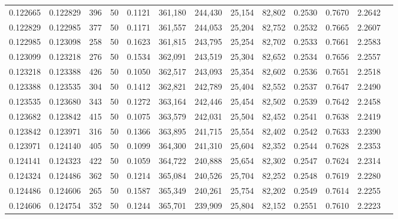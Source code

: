 \begin{tabular}{rrrrrrrrrrrrr}
0.122665 & 0.122829 &   396 &  50 &                                     0.1121 & 361,180 & 244,430 &  25,154 &  82,802 & 0.2530 & 0.7670 & 2.2642 \\
0.122829 & 0.122985 &   377 &  50 &                                     0.1171 & 361,557 & 244,053 &  25,204 &  82,752 & 0.2532 & 0.7665 & 2.2607 \\
0.122985 & 0.123098 &   258 &  50 &                                     0.1623 & 361,815 & 243,795 &  25,254 &  82,702 & 0.2533 & 0.7661 & 2.2583 \\
0.123099 & 0.123218 &   276 &  50 &                                     0.1534 & 362,091 & 243,519 &  25,304 &  82,652 & 0.2534 & 0.7656 & 2.2557 \\
0.123218 & 0.123388 &   426 &  50 &                                     0.1050 & 362,517 & 243,093 &  25,354 &  82,602 & 0.2536 & 0.7651 & 2.2518 \\
0.123388 & 0.123535 &   304 &  50 &                                     0.1412 & 362,821 & 242,789 &  25,404 &  82,552 & 0.2537 & 0.7647 & 2.2490 \\
0.123535 & 0.123680 &   343 &  50 &                                     0.1272 & 363,164 & 242,446 &  25,454 &  82,502 & 0.2539 & 0.7642 & 2.2458 \\
0.123682 & 0.123842 &   415 &  50 &                                     0.1075 & 363,579 & 242,031 &  25,504 &  82,452 & 0.2541 & 0.7638 & 2.2419 \\
0.123842 & 0.123971 &   316 &  50 &                                     0.1366 & 363,895 & 241,715 &  25,554 &  82,402 & 0.2542 & 0.7633 & 2.2390 \\
0.123971 & 0.124140 &   405 &  50 &                                     0.1099 & 364,300 & 241,310 &  25,604 &  82,352 & 0.2544 & 0.7628 & 2.2353 \\
0.124141 & 0.124323 &   422 &  50 &                                     0.1059 & 364,722 & 240,888 &  25,654 &  82,302 & 0.2547 & 0.7624 & 2.2314 \\
0.124324 & 0.124486 &   362 &  50 &                                     0.1214 & 365,084 & 240,526 &  25,704 &  82,252 & 0.2548 & 0.7619 & 2.2280 \\
0.124486 & 0.124606 &   265 &  50 &                                     0.1587 & 365,349 & 240,261 &  25,754 &  82,202 & 0.2549 & 0.7614 & 2.2255 \\
0.124606 & 0.124754 &   352 &  50 &                                     0.1244 & 365,701 & 239,909 &  25,804 &  82,152 & 0.2551 & 0.7610 & 2.2223 \\

\end{tabular}

